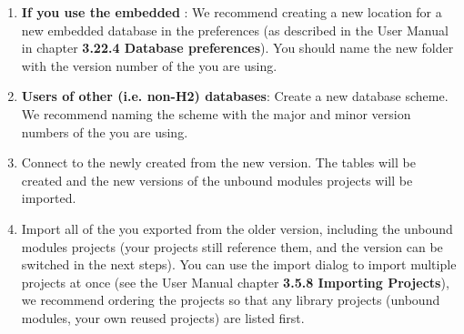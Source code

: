 \begin{enumerate}
\item \textbf{If you use the embedded \gddb{}}: We recommend creating a new location for a new embedded database in the preferences (as described in the User Manual in chapter \textbf{3.22.4 Database preferences}). You should name the new folder with the version number of the \ite{} you are using. 
\item \textbf{Users of other (i.e. non-H2) databases}: Create a new database scheme. We recommend naming the scheme with the major and minor version numbers of the \ite{} you are using. 
\item Connect to the newly created \gddb{} from the new version. The \gddb{} tables will be created and the new versions of the unbound modules projects will be imported.  
\item Import all of the \gdprojects{} you exported from the older version, including the unbound modules projects (your projects still reference them, and the version can be switched in the next steps). You can use the import dialog to import multiple projects at once (see the User Manual chapter \textbf{3.5.8 Importing Projects}), we recommend ordering the projects so that any library projects (unbound modules, your own reused projects) are listed first.
\end{enumerate}
